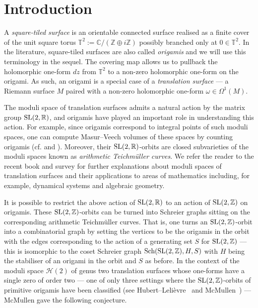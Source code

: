 \documentclass[a4paper,11pt]{amsart}
\numberwithin{equation}{section}
\numberwithin{figure}{section}
\numberwithin{table}{section}
\newcommand{\calH}{\mathcal{H}}
\newcommand{\Z}{\mathbb{Z}}
\newcommand{\R}{\mathbb{R}}
\DeclareMathOperator{\SL}{{\rm{SL}}}
\begin{document}
\maketitle
\tableofcontents


\section{Introduction}

A \textit{square-tiled surface} is an orientable connected surface realised as a finite cover of the unit square torus $\mathbb{T}^2:=\mathbb{C}/(\mathbb{Z}\oplus i\mathbb{Z})$ possibly branched only at $0\in\mathbb{T}^2$. In the literature, square-tiled surfaces are also called \textit{origamis} and we will use this terminology in the sequel. The covering map allows us to pullback the holomorphic one-form $dz$ from $\mathbb{T}^{2}$ to a non-zero holomorphic one-form on the origami. As such, an origami is a special case of a \textit{translation surface} --- a Riemann surface $M$ paired with a non-zero holomorphic one-form $\omega\in\Omega^{1}(M)$.

The moduli space of translation surfaces admits a natural action by the matrix group $\SL(2,\R)$, and origamis have played an important role in understanding this action. For example, since origamis correspond to integral points of such moduli spaces, one can compute Masur--Veech volumes of these spaces by counting origamis (cf. \cite{Zo} and \cite{EsOk}). Moreover, their $\SL(2,\mathbb{R})$-orbits are closed subvarieties of the moduli spaces known as \emph{arithmetic Teichm\"uller curves}. We refer the reader to the recent book \cite{AtMa} and survey \cite{Fil} for further explanations about moduli spaces of translation surfaces and their applications to areas of mathematics including, for example, dynamical systems and algebraic geometry.

It is possible to restrict the above action of $\SL(2,\R)$ to an action of $\SL(2,\Z)$ on origamis. These $\SL(2,\mathbb{Z})$-orbits can be turned into Schreier graphs sitting on the corresponding arithmetic Teichm\"uller curves. That is, one turns an $\SL(2,\Z)$-orbit into a combinatorial graph by setting the vertices to be the origamis in the orbit with the edges corresponding to the action of a generating set $S$ for $\SL(2,\Z)$ --- this is isomorphic to the coset Schreier graph $\text{Sch}(\SL(2,\Z), H ,S)$ with $H$ being the stabiliser of an origami in the orbit and $S$ as before. In the context of the moduli space $\calH(2)$ of genus two translation surfaces whose one-forms have a single zero of order two --- one of only three settings where the $\SL(2,\Z)$-orbits of primitive origamis have been classified (see Hubert--Leli\`evre~\cite{HL} and McMullen~\cite{McM}) --- McMullen gave the following conjecture.
\end{document}
